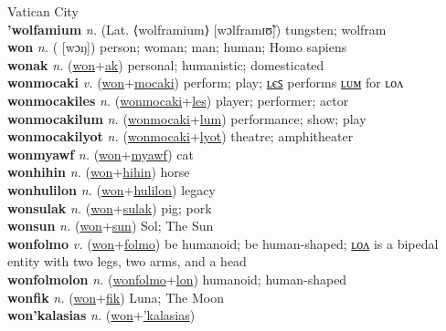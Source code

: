 Vatican City \label{'watikanatec} \\
\textbf{'wolfamium} \textit{n.} (Lat. ⟨wolframium⟩ [wɔlframɪʊ̃])
tungsten; wolfram \label{'wolfamium} \\
\textbf{won} \textit{n.} ( [wɔŋ])
person; woman; man; human; Homo sapiens \label{won} \\
\textbf{wonak} \textit{n.} (\hyperref[won]{won}+\hyperref[ak]{ak})
personal; humanistic; domesticated \label{wonak} \\
\textbf{wonmocaki} \textit{v.} (\hyperref[won]{won}+\hyperref[mocaki]{mocaki})
perform; play; \hyperref[wonmocakiles]{ʟєꜱ} performs \hyperref[wonmocakilum]{ʟᴜᴍ} for ʟᴏᴧ \label{wonmocaki} \\
\textbf{wonmocakiles} \textit{n.} (\hyperref[wonmocaki]{wonmocaki}+\hyperref[les]{les})
player; performer; actor \label{wonmocakiles} \\
\textbf{wonmocakilum} \textit{n.} (\hyperref[wonmocaki]{wonmocaki}+\hyperref[lum]{lum})
performance; show; play \label{wonmocakilum} \\
\textbf{wonmocakilyot} \textit{n.} (\hyperref[wonmocaki]{wonmocaki}+\hyperref[lyot]{lyot})
theatre; amphitheater \label{wonmocakilyot} \\
\textbf{wonmyawf} \textit{n.} (\hyperref[won]{won}+\hyperref[myawf]{myawf})
cat \label{wonmyawf} \\
\textbf{wonhihin} \textit{n.} (\hyperref[won]{won}+\hyperref[hihin]{hihin})
horse \label{wonhihin} \\
\textbf{wonhulilon} \textit{n.} (\hyperref[won]{won}+\hyperref[hulilon]{hulilon})
legacy \label{wonhulilon} \\
\textbf{wonsulak} \textit{n.} (\hyperref[won]{won}+\hyperref[sulak]{sulak})
pig; pork \label{wonsulak} \\
\textbf{wonsun} \textit{n.} (\hyperref[won]{won}+\hyperref[sun]{sun})
Sol; The Sun \label{wonsun} \\
\textbf{wonfolmo} \textit{v.} (\hyperref[won]{won}+\hyperref[folmo]{folmo})
be humanoid; be human-shaped; \hyperref[wonfolmolon]{ʟᴏᴧ} is a bipedal entity with two legs, two arms, and a head \label{wonfolmo} \\
\textbf{wonfolmolon} \textit{n.} (\hyperref[wonfolmo]{wonfolmo}+\hyperref[lon]{lon})
humanoid; human-shaped \label{wonfolmolon} \\
\textbf{wonfik} \textit{n.} (\hyperref[won]{won}+\hyperref[fik]{fik})
Luna; The Moon \label{wonfik} \\
\textbf{won'kalasias} \textit{n.} (\hyperref[won]{won}+\hyperref['kalasias]{'kalasias})
